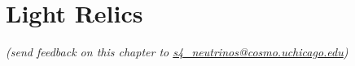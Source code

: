  
\chapter{Light Relics}


\def\beq{\begin{equation}}
\def\eeq{\end{equation}}

\def\bea{\begin{eqnarray}}
\def\eea{\end{eqnarray}}

\def\Neff{N_{\rm eff}}
\def\Nf{N_{\rm eff}}
\def\gs{g_{\star}}
\def\Mpl{M_{\rm pl}}


\def\gtrsim{\raise-.75ex\hbox{$\buildrel>\over\sim$}}
\def\lsim{\raise-.75ex\hbox{$\buildrel<\over\sim$}}

\begin{center}
{\small \it (send feedback on this chapter to \href{mailto:s4_neutrinos@cosmo.uchicago.edu}{s4\_neutrinos@cosmo.uchicago.edu})}
\end{center}

